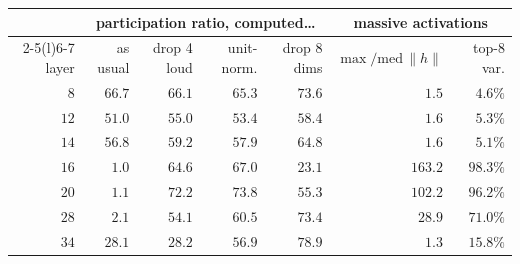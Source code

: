 \begin{tabular}{@{}rrrrrrr@{}}
\toprule
& \multicolumn{4}{c}{participation ratio, computed\ldots} & \multicolumn{2}{c}{massive activations} \\
\cmidrule(lr){2-5}\cmidrule(l){6-7}
layer & as usual & drop 4 loud & unit-norm. & drop 8 dims & $\max/\mathrm{med}\,\|h\|$ & top-8 var. \\
\midrule
$8$ & $66.7$ & $66.1$ & $65.3$ & $73.6$ & $1.5$ & $4.6\%$ \\
$12$ & $51.0$ & $55.0$ & $53.4$ & $58.4$ & $1.6$ & $5.3\%$ \\
$14$ & $56.8$ & $59.2$ & $57.9$ & $64.8$ & $1.6$ & $5.1\%$ \\
$16$ & $1.0$ & $64.6$ & $67.0$ & $23.1$ & $163.2$ & $98.3\%$ \\
$20$ & $1.1$ & $72.2$ & $73.8$ & $55.3$ & $102.2$ & $96.2\%$ \\
$28$ & $2.1$ & $54.1$ & $60.5$ & $73.4$ & $28.9$ & $71.0\%$ \\
$34$ & $28.1$ & $28.2$ & $56.9$ & $78.9$ & $1.3$ & $15.8\%$ \\
\bottomrule
\end{tabular}
